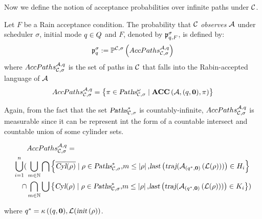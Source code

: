 Now we define the notion of acceptance probabilities over infinite paths under $\mathcal{C}$.
\begin{definition}
Let $F$ be a Rain acceptance condition.
The probability that $\mathcal{C}$ \emph{observes} $\mathcal{A}$ under scheduler $\sigma$, initial mode $q\in Q$ and $F$, denoted by $\mathfrak{p}_{q,F}^{\sigma}$, is defined by:
\[
    \mathfrak{p}_{q}^{\sigma}
        :=
            \mathbb{P}^{\mathcal{C},\sigma}\left(
                AccPaths _{\mathcal{C},\sigma} ^{\mathcal{A},q}
            \right)
\]
where $AccPaths _{\mathcal{C},\sigma} ^{\mathcal{A},q}$ is the set of paths in $\mathcal{C}$ that falls into the Rabin-accepted language of $\mathcal{A}$
$$
    AccPaths _{\mathcal{C},\sigma} ^{\mathcal{A},q} = \left \{ 
        \pi \in \mbox{\sl Paths}^\omega_{\mathcal{C},\sigma} \mid 
        \mbox{\bf ACC} \left( {\mathcal{A}}, {(q,\mathbf{0})}, {\pi} \right)
    \right\}
$$
\end{definition}
Again, from the fact that the set $\mbox{\sl Paths}^*_{\mathcal{C},\sigma}$ is countably-infinite, 
$AccPaths _{\mathcal{C},\sigma} ^{\mathcal{A},q}$ is measurable since it can be represent int the 
form of a countable intersect and countable union of some cylinder sets.
\begin{small}
\begin{align*}
    &
    AccPaths _{\mathcal{C},\sigma} ^{\mathcal{A},q} = \\
        \bigcup_{i=1}^{n} ( 
            & 
            \bigcup_{m \in \mathbb{N}}
            \bigcap \left \{
                \overline{\mbox{\sl Cyl}(\rho)}
                \mid
                \rho \in \mbox{\sl Paths}^*_{\mathcal{C},\sigma}
                \mbox{,} 
                m \le \left| \rho \right|    
                \mbox{,} 
                \mbox{\sl last}\left(
                    \mbox{\sl traj} (  
                        {\mathcal{A}}_{\left(q^*,\mathbf{0}\right)}\left(\mathcal{L}(\rho)\right) 
                     )
                \right) \in H_i
            \right \} 
            \\
            \cap 
            & 
            \bigcap_{m \in \mathbb{N}}
            \bigcup \left \{
                \mbox{\sl Cyl}(\rho)
                \mid
                \rho \in \mbox{\sl Paths}^*_{\mathcal{C},\sigma}
                \mbox{,} 
                m \le \left| \rho \right|    
                \mbox{,} 
                \mbox{\sl last}\left(
                    \mbox{\sl traj} (  
                        {\mathcal{A}}_{\left(q^*,\mathbf{0}\right)}\left(\mathcal{L}(\rho)\right) 
                     )
                \right) \in K_i
            \right \}
        )
\end{align*}
\end{small}
where
$
    q^*
        =
            \kappa \left(
                (q,\mathbf{0}), 
                \mathcal{L} (
                    \mbox{\sl init}\left(\rho\right)
            \right)
$.


